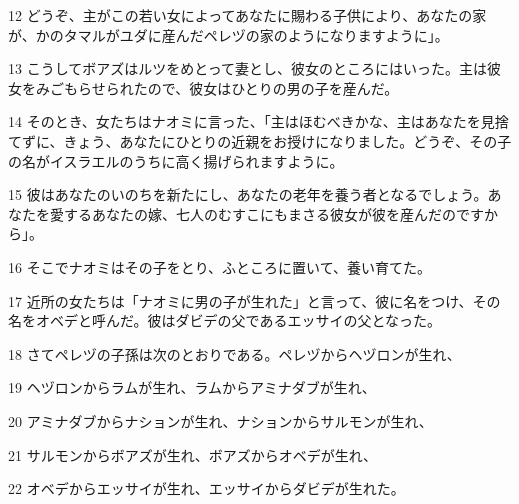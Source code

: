 \par 12 どうぞ、主がこの若い女によってあなたに賜わる子供により、あなたの家が、かのタマルがユダに産んだペレヅの家のようになりますように」。
\par 13 こうしてボアズはルツをめとって妻とし、彼女のところにはいった。主は彼女をみごもらせられたので、彼女はひとりの男の子を産んだ。
\par 14 そのとき、女たちはナオミに言った、「主はほむべきかな、主はあなたを見捨てずに、きょう、あなたにひとりの近親をお授けになりました。どうぞ、その子の名がイスラエルのうちに高く揚げられますように。
\par 15 彼はあなたのいのちを新たにし、あなたの老年を養う者となるでしょう。あなたを愛するあなたの嫁、七人のむすこにもまさる彼女が彼を産んだのですから」。
\par 16 そこでナオミはその子をとり、ふところに置いて、養い育てた。
\par 17 近所の女たちは「ナオミに男の子が生れた」と言って、彼に名をつけ、その名をオベデと呼んだ。彼はダビデの父であるエッサイの父となった。
\par 18 さてペレヅの子孫は次のとおりである。ペレヅからヘヅロンが生れ、
\par 19 ヘヅロンからラムが生れ、ラムからアミナダブが生れ、
\par 20 アミナダブからナションが生れ、ナションからサルモンが生れ、
\par 21 サルモンからボアズが生れ、ボアズからオベデが生れ、
\par 22 オベデからエッサイが生れ、エッサイからダビデが生れた。


